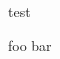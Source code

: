 \documentclass[aspectratio=\aspectratio]{beamer}
\begin{document}
test 

\ifnum{} %
    foo
\else
    bar
\fi
\end{document}
